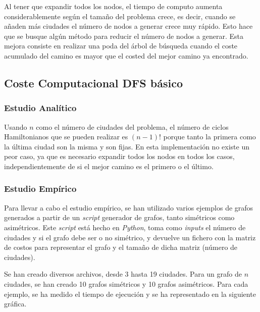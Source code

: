 \documentclass{uc3mpracticas}
\begin{document}
  Al tener que expandir todos los nodos, el tiempo de computo aumenta considerablemente según el tamaño del problema crece, es decir, cuando se añaden más ciudades el número de nodos a generar crece muy rápido. Esto hace que se busque algún método para reducir el número de nodos a generar. Esta mejora consiste en realizar una poda del árbol de búsqueda cuando el coste acumulado del camino es mayor que el costed del mejor camino ya encontrado.



  \subsection{Coste Computacional DFS básico}

  \subsubsection{Estudio Analítico}

  Usando $n$ como el número de ciudades del problema, el número de ciclos Hamiltonianos que se pueden realizar es $(n-1)!$ porque tanto la primera como la última ciudad son la misma y son fijas. En esta implementación no existe un peor caso, ya que es necesario expandir todos los nodos en todos los casos, independientemente de si el mejor camino es el primero o el último.

  \vspace{2mm}


  
  \subsubsection{Estudio Empírico}
  
  Para llevar a cabo el estudio empírico, se han utilizado varios ejemplos de grafos generados a partir de un \textit{script} generador de grafos, tanto simétricos como asimétricos. Este \textit{script} está hecho en \textit{Python}, toma como \textit{inputs} el número de ciudades y si el grafo debe ser o no simétrico, y devuelve un fichero con la matriz de costos para representar el grafo y el tamaño de dicha matriz (número de ciudades).
  
  \vspace{2mm} 

  Se han creado diversos archivos, desde 3 hasta 19 ciudades. Para un grafo de $n$ ciudades, se han creado 10 grafos simétricos y 10 grafos asimétricos. Para cada ejemplo, se ha medido el tiempo de ejecución y se ha representado en la siguiente gráfica.
\end{document}
